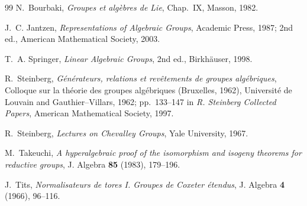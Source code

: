 \begin{thebibliography}{99}
N.~Bourbaki,
\emph{Groupes et algèbres de Lie}, Chap.~IX,
Masson, 1982.

J.~C. Jantzen,
\emph{Representations of Algebraic Groups},
Academic Press, 1987; 2nd ed., American Mathematical Society, 2003.

T.~A. Springer,
\emph{Linear Algebraic Groups}, 2nd ed.,
Birkhäuser, 1998.

R.~Steinberg,
\emph{Générateurs, relations et revêtements de groupes algébriques},
Colloque sur la théorie des groupes algébriques (Bruxelles, 1962),
Université de Louvain and Gauthier--Villars, 1962;
pp.~133--147 in \emph{R. Steinberg Collected Papers},
American Mathematical Society, 1997.

R.~Steinberg,
\emph{Lectures on Chevalley Groups},
Yale University, 1967.

M.~Takeuchi,
\emph{A hyperalgebraic proof of the isomorphism and isogeny
theorems for reductive groups},
J. Algebra \textbf{85} (1983), 179--196.

J.~Tits,
\emph{Normalisateurs de tores I. Groupes de Coxeter étendus},
J. Algebra \textbf{4} (1966), 96--116.
\end{thebibliography}




